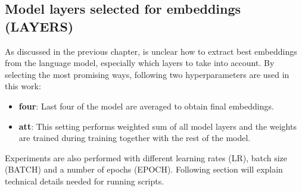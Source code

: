\subsection{Model layers selected for embeddings (LAYERS)}
As discussed in the previous chapter, is unclear how to extract best embeddings from the language model, especially which layers to take into account. By selecting the most promising ways, following two hyperparameters are used in this work:
\begin{itemize}
\item \textbf{four}: Last four of the model are averaged to obtain final embeddings.
\item \textbf{att}: This setting performs weighted sum of all model layers and the weights are trained during training together with the rest of the model.
\end{itemize}
Experiments are also performed with different learning rates (LR), batch size (BATCH) and a number of epochs (EPOCH). 
Following section will explain technical details needed for running scripts.

